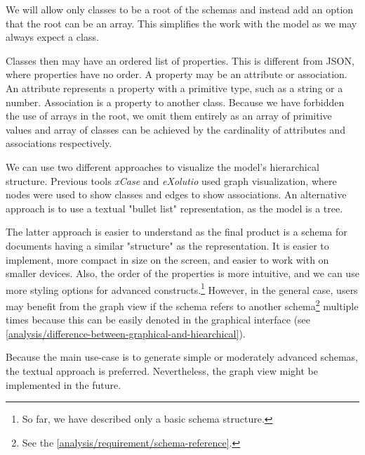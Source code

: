 We will allow only classes to be a root of the schemas and instead add an option that the root can be an array. This simplifies the work with the model as we may always expect a class.

Classes then may have an ordered list of properties. This is different from JSON, where properties have no order. A property may be an attribute or association. An attribute represents a property with a primitive type, such as a string or a number. Association is a property to another class. Because we have forbidden the use of arrays in the root, we omit them entirely as an array of primitive values and array of classes can be achieved by the cardinality of attributes and associations respectively.

\smallskip

We can use two different approaches to visualize the model's hierarchical structure. Previous tools \textit{xCase} and \textit{eXolutio} used graph visualization, where nodes were used to show classes and edges to show associations. An alternative approach is to use a textual "bullet list" representation, as the model is a tree.

The latter approach is easier to understand as the final product is a schema for documents having a similar "structure" as the representation. It is easier to implement, more compact in size on the screen, and easier to work with on smaller devices. Also, the order of the properties is more intuitive, and we can use more styling options for advanced constructs.\footnote{So far, we have described only a basic schema structure.} However, in the general case, users may benefit from the graph view if the schema refers to another schema\footnote{See the \autoref{analysis/requirement/schema-reference}.} multiple times because this can be easily denoted in the graphical interface (see \autoref{analysis/difference-between-graphical-and-hiearchical}).

Because the main use-case is to generate simple or moderately advanced schemas, the textual approach is preferred. Nevertheless, the graph view might be implemented in the future.

